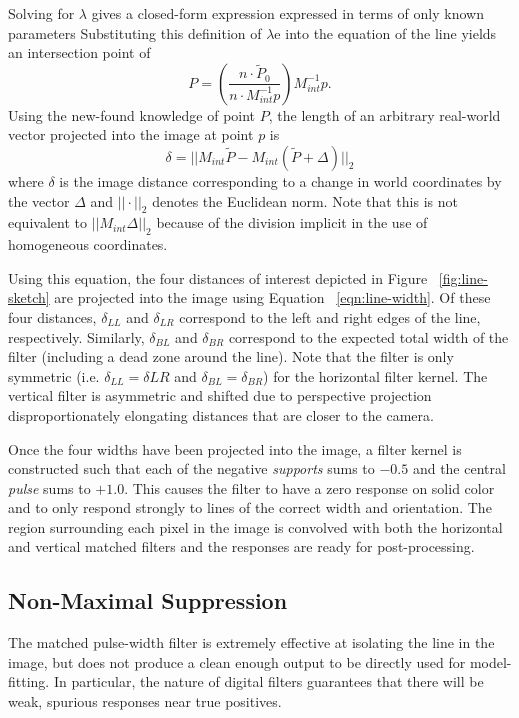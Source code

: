 \documentclass[twocolumn,11pt]{article}
\begin{document}
Solving for $\lambda$ gives a closed-form expression expressed in terms of only
known parameters Substituting this definition of $\lambda$e into the equation
of the line yields an intersection point of
\begin{equation*}
 	P = \left(\frac{n \cdot \tilde{P}_0}{n \cdot M^{-1}_{int} p}\right) M^{-1}_{int} p.
	\label{eqn:line-point}
\end{equation*}
Using the new-found knowledge of point $P$, the length of an arbitrary real-world
vector projected into the image at point $p$ is
\begin{equation}
	\delta = ||M_{int} \tilde{P} - M_{int} (\tilde{P} + \Delta)||_2
	\label{eqn:line-width}
\end{equation}
where $\delta$ is the image distance corresponding to a change in world
coordinates by the vector $\Delta$ and $||\cdot||_2$ denotes the Euclidean
norm. Note that this is not equivalent to $||M_{int}\Delta||_2$ because of the
division implicit in the use of homogeneous coordinates.

Using this equation, the four distances of interest depicted in Figure
~\ref{fig:line-sketch} are projected into the image using Equation
~\ref{eqn:line-width}. Of these four distances, $\delta_{LL}$ and $\delta_{LR}$
correspond to the left and right edges of the line, respectively. Similarly,
$\delta_{BL}$ and $\delta_{BR}$ correspond to the expected total width of the
filter (including a dead zone around the line). Note that the filter is only
symmetric (i.e. $\delta_{LL} = \delta{LR}$ and $\delta_{BL} = \delta_{BR}$) for
the horizontal filter kernel. The vertical filter is asymmetric and shifted due
to perspective projection disproportionately elongating distances that are closer
to the camera.

Once the four widths have been projected into the image, a filter kernel is
constructed such that each of the negative \textit{supports} sums to $-0.5$
and the central \textit{pulse} sums to $+1.0$. This causes the filter to have
a zero response on solid color and to only respond strongly to lines of the
correct width and orientation. The region surrounding each pixel in the image
is convolved with both the horizontal and vertical matched filters and the
responses are ready for post-processing.

\subsection{Non-Maximal Suppression}
\label{sec:line-max}
The matched pulse-width filter is extremely effective at isolating the line in
the image, but does not produce a clean enough output to be directly used for
model-fitting. In particular, the nature of digital filters guarantees that
there will be weak, spurious responses near true positives.
\end{document}
